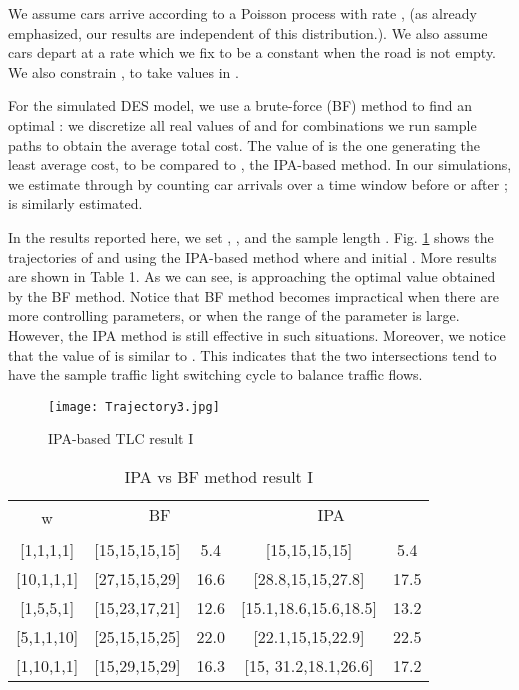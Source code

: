 \documentclass{ifacconf}\usepackage{graphicx}
\begin{document}
We assume cars arrive according to a Poisson process with rate ,  (as already emphasized, our results are independent of this
distribution.). We also assume cars depart at a rate  which we fix
to be a constant  when the road is not empty. We also constrain , to
take values in .

For the simulated DES model, we use a brute-force (BF) method to find an
optimal : we discretize all real values of 
and for  combinations we run  sample paths
to obtain the average total cost. The value of  is the one
generating the least average cost, to be compared to ,
the IPA-based method. In our simulations, we estimate  through  by
counting car arrivals  over a time window  before or after
;  is similarly estimated.

In the results reported here, we set ,
,    and the sample length . Fig. \ref{Trajectory} shows the trajectories of  and
 using the IPA-based method where  and initial  . More results are
shown in Table 1. As we can see,  is approaching the
optimal value obtained by the BF method. Notice that BF method becomes
impractical when there are more controlling parameters, or when the range of
the parameter is large. However, the IPA method is still effective in such
situations. Moreover, we notice that the value of  is similar to . This indicates that the two intersections tend to have the sample traffic light switching cycle to balance traffic flows.

\begin{figure}[tbh]
\centering
\texttt{[image: Trajectory3.jpg]}\caption{IPA-based TLC result I }\label{Trajectory}\end{figure}

\begin{table}[tbh]
\caption{IPA vs BF method result I}\label{table1}	
\begin{center}\begin{tabular}
[c]{|c|c|c||c|c|}\hline
\multirow{2}{*}{w} & \multicolumn{2}{|c||}{BF} & \multicolumn{2}{|c|}{IPA}\\\cline{2-5}
 &  &  &  & \\\hline
{[1,1,1,1]}  & [15,15,15,15] & 5.4 & [15,15,15,15] & 5.4\\\hline
{[10,1,1,1]}  & [27,15,15,29] & 16.6 & [28.8,15,15,27.8] & 17.5\\\hline
{[1,5,5,1]}  & [15,23,17,21] & 12.6 & [15.1,18.6,15.6,18.5] & 13.2\\\hline
{[5,1,1,10]}  & [25,15,15,25] & 22.0 & [22.1,15,15,22.9] & 22.5\\\hline
{[1,10,1,1]}  & [15,29,15,29] & 16.3 & [15, 31.2,18.1,26.6] & 17.2\\\hline
\end{tabular}
\end{center}
\end{table}
\end{document}
